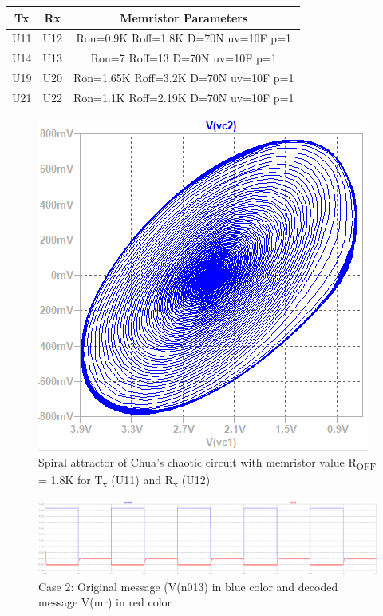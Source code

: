 \begin{center}
\small
\begin{tabular}{|c c c |} 
 \hline
 Tx & Rx & Memristor Parameters \\ [0.5ex] 
 \hline\hline
 U11 & U12 & Ron=0.9K Roff=1.8K D=70N uv=10F p=1 \\ 
 \hline
 U14 & U13 & Ron=7 Roff=13 D=70N uv=10F p=1 \\ 
 \hline
 U19 & U20 & Ron=1.65K Roff=3.2K D=70N uv=10F p=1 \\ 
 \hline
 U21 & U22 & Ron=1.1K Roff=2.19K D=70N uv=10F p=1 \\ 
 \hline
\end{tabular}
\end{center}

\begin{figure}[!b]
    \centering
    \includegraphics[width = 0.65\linewidth]{figs/Fig161_8_Spiral attractor.PNG}
    \caption{Spiral attractor of Chua's chaotic circuit with memristor value R\textsubscript{OFF} = 1.8K for T\textsubscript{x} (U11) and R\textsubscript{x} (U12)}
     \label{fig:10}
\end{figure}

\begin{figure}[!b]
    \centering
    \includegraphics[width = 0.8\linewidth]{figs/Fig17U11_1_8K.PNG}
    \caption{Case 2: Original message (V(n013) in blue color and decoded message V(mr) in red color}
     \label{fig:11}
\end{figure}

